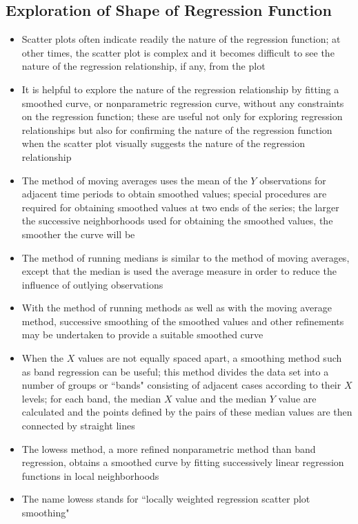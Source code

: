 \subsection{Exploration of Shape of Regression Function}
\begin{itemize}
\item Scatter plots often indicate readily the nature of the regression function; at other times, the scatter plot is complex and it becomes difficult to see the nature of the regression relationship, if any, from the plot
\item It is helpful to explore the nature of the regression relationship by fitting a smoothed curve, or nonparametric regression curve, without any constraints on the regression function; these are useful not only for exploring regression relationships but also for confirming the nature of the regression function when the scatter plot visually suggests the nature of the regression relationship
\item The method of moving averages uses the mean of the $Y$ observations for adjacent time periods to obtain smoothed values; special procedures are required for obtaining smoothed values at two ends of the series; the larger the successive neighborhoods used for obtaining the smoothed values, the smoother the curve will be 
\item The method of running medians is similar to the method of moving averages, except that the median is used the average measure in order to reduce the influence of outlying observations
\item With the method of running methods as well as with the moving average method, successive smoothing of the smoothed values and other refinements may be undertaken to provide a suitable smoothed curve
\item When the $X$ values are not equally spaced apart, a smoothing method such as band regression can be useful; this method divides the data set into a number of groups or ``bands" consisting of adjacent cases according to their $X$ levels; for each band, the median $X$ value and the median $Y$ value are calculated and the points defined by the pairs of these median values are then connected by straight lines
\item The lowess method, a more refined nonparametric method than band regression, obtains a smoothed curve by fitting successively linear regression functions in local neighborhoods 
\item The name lowess stands for ``locally weighted regression scatter plot smoothing" 

\end{itemize}
